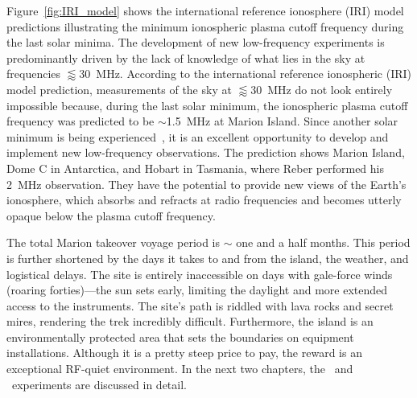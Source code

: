 Figure~\ref{fig:IRI_model} shows the international reference ionosphere (IRI) model~\citep{ars-16-1-2018} predictions illustrating the minimum ionospheric plasma cutoff frequency during the last solar minima. The development of new low-frequency experiments is predominantly driven by the lack of knowledge of what lies in the sky at frequencies $\lessapprox$\SI{30}{\mega\hertz}.  According to the international reference ionospheric (IRI) model prediction, measurements of the sky at $\lessapprox$\SI{30}{\mega\hertz} do not look entirely impossible because, during the last solar minimum, the ionospheric plasma cutoff frequency was predicted to be $\sim$\SI{1.5}{\mega\hertz} at Marion Island. Since another solar minimum is being experienced~\citep{2018NatCo...9.5209B}, it is an excellent opportunity to develop and implement new low-frequency observations. The prediction shows Marion Island, Dome C in Antarctica, and Hobart in Tasmania, where Reber performed his \SI{2}{\mega\hertz} observation. They have the potential to provide new views of the Earth's ionosphere, which absorbs and refracts at radio frequencies and becomes utterly opaque below the plasma cutoff frequency. 

The total Marion takeover voyage period is $\sim$ one and a half months. This period is further shortened by the days it takes to and from the island, the weather, and logistical delays. The site is entirely inaccessible on days with gale-force winds (roaring forties)—the sun sets early, limiting the daylight and more extended access to the instruments. The site's path is riddled with lava rocks and secret mires, rendering the trek incredibly difficult. Furthermore, the island is an environmentally protected area that sets the boundaries on equipment installations. Although it is a pretty steep price to pay, the reward is an exceptional RF-quiet environment. In the next two chapters, the \prizm\ and \albatros\ experiments are discussed in detail.

